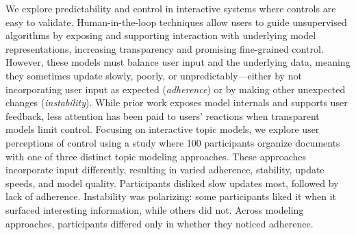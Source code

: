 We explore predictability and control in interactive systems where controls are easy to validate.
Human-in-the-loop techniques allow users to guide unsupervised
algorithms by exposing and supporting interaction with underlying
model representations, increasing transparency and promising fine-grained control.
However, these models must balance user input and the underlying
data, meaning they sometimes update slowly, poorly, or
unpredictably---either by not incorporating user input as expected
(\textit{adherence}) or by making other unexpected changes
(\textit{instability}).
While prior work exposes model internals and supports user feedback,
less attention has been paid to users' reactions when transparent
models limit control.
Focusing on interactive topic models, we explore user perceptions of control using a study
where 100 participants organize documents with one of three
distinct topic modeling approaches.
These approaches incorporate input differently, resulting
in varied adherence, stability, update speeds, and model quality.
Participants disliked slow updates most, followed by lack of
adherence.
Instability was polarizing: some participants liked it when it
surfaced interesting information, while others did not.
Across modeling approaches, participants differed only in whether
they noticed adherence.
